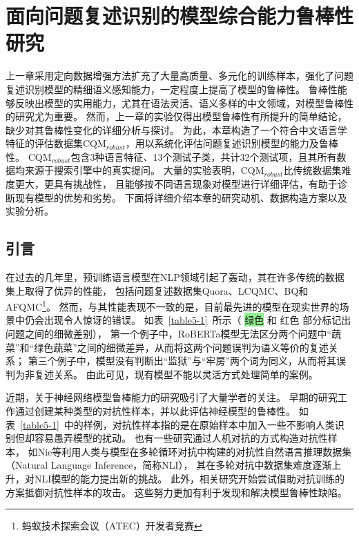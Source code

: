 \chapter{面向问题复述识别的模型综合能力鲁棒性研究}\label{5.point3}

上一章采用定向数据增强方法扩充了大量高质量、多元化的训练样本，强化了问题复述识别模型的精细语义感知能力，一定程度上提高了模型的鲁棒性。
鲁棒性能够反映出模型的实用能力，尤其在语法灵活、语义多样的中文领域，对模型鲁棒性的研究尤为重要。
然而，上一章的实验仅得出模型鲁棒性有所提升的简单结论，缺少对其鲁棒性变化的详细分析与探讨。
为此，本章构造了一个符合中文语言学特征的评估数据集CQM$_{robust}$，用以系统化评估问题复述识别模型的能力及鲁棒性。
CQM$_{robust}$包含3种语言特征、13个测试子类，共计32个测试项，且其所有数据均来源于搜索引擎中的真实提问。
大量的实验表明，CQM$_{robust}$比传统数据集难度更大，更具有挑战性，
且能够按不同语言现象对模型进行详细评估，有助于诊断现有模型的优势和劣势。
下面将详细介绍本章的研究动机、数据构造方案以及实验分析。

\section{引言}

在过去的几年里，预训练语言模型在NLP领域引起了轰动，其在许多传统的数据集上取得了优异的性能，
包括问题复述数据集Quora\cite{iyer2017first}、LCQMC\cite{liu2018lcqmc}、BQ\cite{chen2018bq}和AFQMC\footnote{蚂蚁技术探索会议（ATEC）开发者竞赛}。
然而，与其性能表现不一致的是，目前最先进的模型在现实世界的场景中仍会出现令人惊讶的错误。
如表~\ref{table5-1}~所示（ {\kai\colorbox{lightgreen}{\color{darkgreen}绿色}} 和 {\kai\colorbox{lightred}{\color{darkred}红色}} 部分标记出问题之间的细微差别），
第一个例子中，RoBERTa模型无法区分两个问题中{\kai“蔬菜”}和{\kai“绿色蔬菜”}之间的细微差异，从而将这两个问题误判为语义等价的复述关系；
第三个例子中，模型没有判断出{\kai“监狱”}与{\kai“牢房”}两个词为同义，从而将其误判为非复述关系。
由此可见，现有模型不能以灵活方式处理简单的案例。



近期，关于神经网络模型鲁棒能力的研究吸引了大量学者的关注。
早期的研究工作通过创建某种类型的对抗性样本，并以此评估神经模型的鲁棒性\cite{jia2017adversarial,alzantot2018generating,ren2019generating,jin2020bert}。
如表~\ref{table5-1}~中的样例，对抗性样本指的是在原始样本中加入一些不影响人类识别但却容易愚弄模型的扰动。
也有一些研究通过人机对抗的方式构造对抗性样本，
如Nie等利用人类与模型在多轮循环对抗中构建的对抗性自然语言推理数据集（Natural Language Inference，简称NLI）\cite{nie2019adversarial}，
其在多轮对抗中数据集难度逐渐上升，对NLI模型的能力提出新的挑战。
此外，相关研究开始尝试借助对抗训练的方案\cite{min2020syntactic,bao2021defending,wang2021natural}抵御对抗性样本的攻击。
这些努力更加有利于发现和解决模型鲁棒性缺陷。

